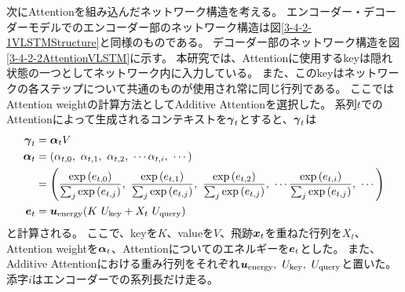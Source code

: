 次にAttentionを組み込んだネットワーク構造を考える。
エンコーダー・デコーダーモデルでのエンコーダー部のネットワーク構造は図\ref{3-4-2-1VLSTMStructure}と同様のものである。
デコーダー部のネットワーク構造を図\ref{3-4-2-2AttentionVLSTM}に示す。
本研究では、Attentionに使用するkeyは隠れ状態の一つとしてネットワーク内に入力している。
また、このkeyはネットワークの各ステップについて共通のものが使用され常に同じ行列である。
ここではAttention weightの計算方法としてAdditive Attentionを選択した。
系列$t$でのAttentionによって生成されるコンテキストを${\mbox{\boldmath{$\gamma$}}}_{t}$とすると、${\mbox{\boldmath{$\gamma$}}}_{t}$は
\begin{equation}
 \begin{split}
  {\mbox{\boldmath{$\gamma$}}}_{t} 
  &= {\mbox{\boldmath{$\alpha$}}}_{t} V\\
  {\mbox{\boldmath{$\alpha$}}}_{t}
  &= (\alpha_{t,0},\ \alpha_{t,1},\ \alpha_{t,2},\ \cdots \alpha_{t,i},\ \cdots) \\
  &= \left(\frac{\exp{({{e}}_{t,0})}}{\sum_j \exp{({{e}}_{t,j})}},\ \frac{\exp{({{e}}_{t,1})}}{\sum_j \exp{({{e}}_{t,j})}},\ \frac{\exp{({{e}}_{t,2})}}{\sum_j \exp{({{e}}_{t,j})}},\  \cdots \frac{\exp{({{e}}_{t,i})}}{\sum_j \exp{({{e}}_{t,j})}},\ \cdots\right)\\
  {\mbox{\boldmath{$e$}}}_{t}
  &={\mbox{\boldmath{$u$}}}_{\rm energy} (K\ U_{\rm key} + X_t\ U_{\rm query}) \\
 \end{split}
\end{equation}
と計算される。
ここで、keyを$K$、valueを$V$、飛跡${\mbox{\boldmath{$x$}}}_{t}$を重ねた行列を$X_t$、Attention weightを${\mbox{\boldmath{$\alpha$}}}_{t}$、Attentionについてのエネルギーを${\mbox{\boldmath{$e$}}}_{t}$とした。
また、Additive Attentionにおける重み行列をそれぞれ${\mbox{\boldmath{$u$}}}_{\rm energy},\  U_{\rm key},\ U_{\rm query}$と置いた。
添字$i$はエンコーダーでの系列長だけ走る。

